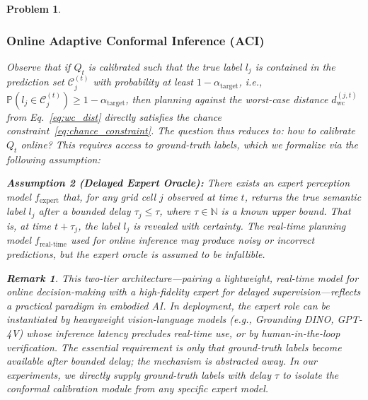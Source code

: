 \documentclass[letterpaper, 10 pt, conference]{ieeeconf}  %
\newtheorem{myprob}{\bf Problem}
\newtheorem{remark}{Remark}
\begin{document}
\begin{myprob}
\subsubsection{Online Adaptive Conformal Inference (ACI)}
\label{subsubsec:aci}

Observe that if $Q_t$ is calibrated such that the true label $l_j$ is contained in the prediction set $\mathcal{C}_j^{(t)}$ with probability at least $1 - \alpha_{\text{target}}$, i.e., $\mathbb{P}(l_j \in \mathcal{C}_j^{(t)}) \ge 1 - \alpha_{\text{target}}$, then planning against the worst-case distance $d_{\text{wc}}^{(j,t)}$ from Eq.~\eqref{eq:wc_dist} directly satisfies the chance constraint~\eqref{eq:chance_constraint}. The question thus reduces to: \textit{how to calibrate $Q_t$ online?} This requires access to ground-truth labels, which we formalize via the following assumption:

\textbf{Assumption 2 (Delayed Expert Oracle):} There exists an expert perception model $f_{\text{expert}}$ that, for any grid cell $j$ observed at time $t$, returns the true semantic label $l_j$ after a bounded delay $\tau_j \le \tau$, where $\tau \in \mathbb{N}$ is a known upper bound. That is, at time $t + \tau_j$, the label $l_j$ is revealed with certainty. The real-time planning model $f_{\text{real-time}}$ used for online inference may produce noisy or incorrect predictions, but the expert oracle is assumed to be infallible.

\begin{remark}
This two-tier architecture---pairing a lightweight, real-time model for online decision-making with a high-fidelity expert for delayed supervision---reflects a practical paradigm in embodied AI. In deployment, the expert role can be instantiated by heavyweight vision-language models (e.g., Grounding DINO, GPT-4V) whose inference latency precludes real-time use, or by human-in-the-loop verification. The essential requirement is only that ground-truth labels become available after bounded delay; the mechanism is abstracted away. In our experiments, we directly supply ground-truth labels with delay $\tau$ to isolate the conformal calibration module from any specific expert model.
\end{remark}


\end{myprob}
\end{document}
